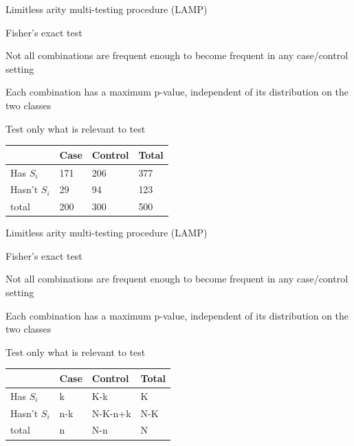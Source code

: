 \documentclass[ignorenonframetext,]{beamer}
\begin{document}
\begin{frame}{Limitless arity multi-testing procedure (LAMP)}

\begin{block}{Fisher's exact test}

Not all combinations are frequent enough to become frequent in any
case/control setting

Each combination has a maximum p-value, independent of its distribution
on the two classes

Test only what is relevant to test

\begin{longtable}[]{@{}llll@{}}
\toprule
& Case & Control & Total\tabularnewline
\midrule
\endhead
Has \(S_i\) & 171 & 206 & 377\tabularnewline
Hasn't \(S_i\) & 29 & 94 & 123\tabularnewline
total & 200 & 300 & 500\tabularnewline
\bottomrule
\end{longtable}

\end{block}

\end{frame}

\begin{frame}{Limitless arity multi-testing procedure (LAMP)}

\begin{block}{Fisher's exact test}

Not all combinations are frequent enough to become frequent in any
case/control setting

Each combination has a maximum p-value, independent of its distribution
on the two classes

Test only what is relevant to test

\begin{longtable}[]{@{}llll@{}}
\toprule
& Case & Control & Total\tabularnewline
\midrule
\endhead
Has \(S_i\) & k & K-k & K\tabularnewline
Hasn't \(S_i\) & n-k & N-K-n+k & N-K\tabularnewline
total & n & N-n & N\tabularnewline
\bottomrule
\end{longtable}

\end{block}

\end{frame}
\end{document}
